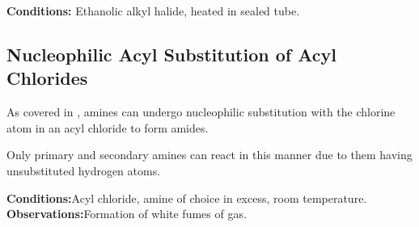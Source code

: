 			\vspace{1.5em}
			\vbox{\textbf{Conditions:}	\tabto{35mm}Ethanolic alkyl halide, heated in sealed tube.}






		\subsection{Nucleophilic Acyl Substitution of Acyl Chlorides}

			As covered in \hyperlink{AcylChloridesReactionWithAmines}{}, amines can undergo nucleophilic substitution
			with the chlorine atom in an acyl chloride to form amides.

			Only primary and secondary amines can react in this manner due to them having unsubstituted hydrogen atoms.

			\vspace{1.5em}
			\vbox{\textbf{Conditions:}\tabto{35mm}Acyl chloride, amine of choice in excess, room temperature.}
			\vbox{\textbf{Observations:}\tabto{35mm}Formation of white fumes of  gas.}

